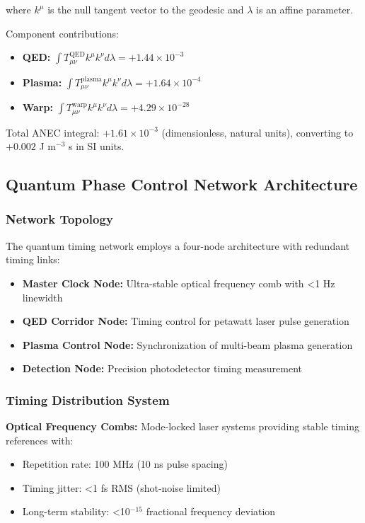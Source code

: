 \documentclass[aps,prl,reprint,groupedaddress,floatfix]{revtex4-1}
\begin{document}
where $k^\mu$ is the null tangent vector to the geodesic and $\lambda$ is an affine parameter.

Component contributions:
\begin{itemize}
    \item \textbf{QED:} $\int T_{\mu\nu}^{\text{QED}} k^\mu k^\nu d\lambda = +1.44 \times 10^{-3}$
    \item \textbf{Plasma:} $\int T_{\mu\nu}^{\text{plasma}} k^\mu k^\nu d\lambda = +1.64 \times 10^{-4}$
    \item \textbf{Warp:} $\int T_{\mu\nu}^{\text{warp}} k^\mu k^\nu d\lambda = +4.29 \times 10^{-28}$
\end{itemize}

Total ANEC integral: $+1.61 \times 10^{-3}$ (dimensionless, natural units), converting to $+0.002$ J m$^{-3}$ s in SI units.

\subsection{Quantum Phase Control Network Architecture}

\subsubsection{Network Topology}

The quantum timing network employs a four-node architecture with redundant timing links:

\begin{itemize}
    \item \textbf{Master Clock Node:} Ultra-stable optical frequency comb with <1 Hz linewidth
    \item \textbf{QED Corridor Node:} Timing control for petawatt laser pulse generation
    \item \textbf{Plasma Control Node:} Synchronization of multi-beam plasma generation
    \item \textbf{Detection Node:} Precision photodetector timing measurement
\end{itemize}

\subsubsection{Timing Distribution System}

\textbf{Optical Frequency Combs:} Mode-locked laser systems providing stable timing references with:
\begin{itemize}
    \item Repetition rate: 100 MHz (10 ns pulse spacing)
    \item Timing jitter: <1 fs RMS (shot-noise limited)
    \item Long-term stability: <10$^{-15}$ fractional frequency deviation
\end{itemize}
\end{document}
